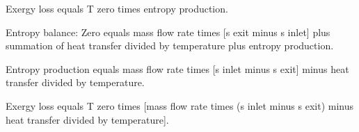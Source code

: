 Exergy loss equals T zero times entropy production.  

Entropy balance:  
Zero equals mass flow rate times [s exit minus s inlet] plus summation of heat transfer divided by temperature plus entropy production.  

Entropy production equals mass flow rate times [s inlet minus s exit] minus heat transfer divided by temperature.  

Exergy loss equals T zero times [mass flow rate times (s inlet minus s exit) minus heat transfer divided by temperature].